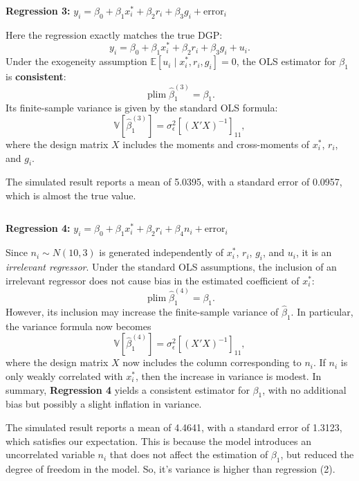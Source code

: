 \documentclass[a4paper,12pt]{article} %
\theoremstyle{nonitalic}
\newenvironment{solution}[1]
  {\renewcommand\theinnercustomsol{#1}\innercustomsol}
  {\endinnercustomsol}
\newcounter{solutionctr}
\renewcommand{\thesolutionctr}{(\alph{solutionctr})}
\newenvironment{autosolution}
  {\stepcounter{solutionctr}\begin{solution}{\thesolutionctr}}
  {\end{solution}}
\begin{document}
\begin{autosolution}
\begin{lstlisting}[language=R]

\end{lstlisting}

\textbf{Regression 3:} $y_i = \beta_0 + \beta_1 x^*_i + \beta_2 r_i + \beta_3 g_i + \text{error}_i$

Here the regression exactly matches the true DGP:
\[
y_i=\beta_0+\beta_1x_i^*+\beta_2r_i+\beta_3g_i+u_i.
\]
Under the exogeneity assumption $\mathbb{E}[u_i\mid x_i^*,r_i,g_i]=0$, the OLS estimator for $\beta_1$ is \textbf{consistent}:
\[
\operatorname*{plim}\hat{\beta}_1^{(3)}=\beta_1.
\]
Its finite-sample variance is given by the standard OLS formula:
\[
\mathbb{V}[\hat{\beta}_1^{(3)}]=\sigma_{\epsilon}^2\left[(X'X)^{-1}\right]_{11},
\]
where the design matrix $X$ includes the moments and cross-moments of $x_i^*$, $r_i$, and $g_i$.

The simulated result reports a mean of 5.0395, with a standard error of 0.0957, which is almost the true value.

\begin{lstlisting}[language=R]

\end{lstlisting}

\textbf{Regression 4:} $y_i = \beta_0 + \beta_1 x^*_i + \beta_2 r_i + \beta_4 n_i + \text{error}_i$

Since $n_i\sim N(10,3)$ is generated independently of $x_i^*$, $r_i$, $g_i$, and $u_i$, 
it is an \emph{irrelevant regressor}. 
Under the standard OLS assumptions, 
the inclusion of an irrelevant regressor does not 
cause bias in the estimated coefficient of $x_i^*$:
\[
\operatorname*{plim}\hat{\beta}_1^{(4)} = \beta_1.
\]
However, its inclusion may increase the finite-sample variance of $\hat{\beta}_1$. 
In particular, the variance formula now becomes
\[
\mathbb{V}[\hat{\beta}_1^{(4)}] = \sigma_{\epsilon}^2\left[(X'X)^{-1}\right]_{11},
\]
where the design matrix $X$ now includes the column corresponding to $n_i$. 
If $n_i$ is only weakly correlated with $x_i^*$, 
then the increase in variance is modest. 
In summary, \textbf{Regression 4} yields a consistent estimator for $\beta_1$, with no additional bias but possibly a slight inflation in variance.

The simulated result reports a mean of 4.4641, with a standard error of 1.3123, which satisfies our expectation.
This is because the model introduces an uncorrelated variable $n_i$ that does not affect the estimation of $\beta_1$, 
but reduced the degree of freedom in the model. So, it's variance is higher than regression (2).


\end{autosolution}
\end{document}
